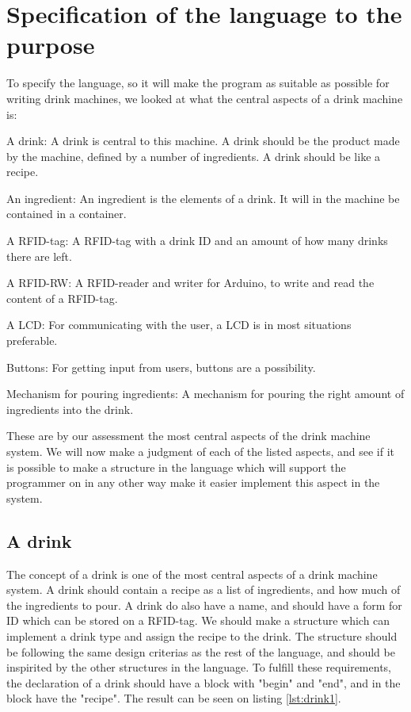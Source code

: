 

\section{Specification of the language to the purpose}
To specify the language, so it will make the program as suitable as possible for writing drink machines, we looked at what the central aspects of a drink machine is:
\begin{inddes}
\item[A drink:] A drink is central to this machine. A drink should be the product made by the machine, defined by a number of ingredients. A drink should be like a recipe.
\item[An ingredient:] An ingredient is the elements of a drink. It will in the machine be contained in a container. 
\item[A RFID-tag:] A RFID-tag with a drink ID and an amount of how many drinks there are left.
\item[A RFID-RW:] A RFID-reader and writer for Arduino, to write and read the content of a RFID-tag.
\item[A LCD:] For communicating with the user, a LCD is in most situations preferable.
\item[Buttons:] For getting input from users, buttons are a possibility. 
\item[Mechanism for pouring ingredients:] A mechanism for pouring the right amount of ingredients into the drink.
\end{inddes}
These are by our assessment the most central aspects of the drink machine system. We will now make a judgment of each of the listed aspects, and see if it is possible to make a structure in the language which will support the programmer on in any other way make it easier implement this aspect in the system.
\subsection{A drink}
The concept of a drink is one of the most central aspects of a drink machine system. A drink should contain a recipe as a list of ingredients, and how much of the ingredients to pour. A drink do also have a name, and should have a form for ID which can be stored on a RFID-tag. We should make a structure which can implement a drink type and assign the recipe to the drink. The structure should be following the same design criterias as the rest of the language, and should be inspirited by the other structures in the language. To fulfill these requirements, the declaration of a drink should have a block with "begin" and "end", and in the block have the "recipe". The result can be seen on listing \ref{lst:drink1}.

